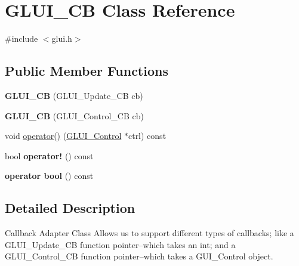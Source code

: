 \hypertarget{class_g_l_u_i___c_b}{\section{G\+L\+U\+I\+\_\+\+C\+B Class Reference}
\label{class_g_l_u_i___c_b}
}


{\ttfamily \#include $<$glui.\+h$>$}

\subsection*{Public Member Functions}
\begin{DoxyCompactItemize}
\item 
\hypertarget{class_g_l_u_i___c_b_a8ee9a7b49fe15afb89985e2218ac17de}{{\bfseries G\+L\+U\+I\+\_\+\+C\+B} (G\+L\+U\+I\+\_\+\+Update\+\_\+\+C\+B cb)}\label{class_g_l_u_i___c_b_a8ee9a7b49fe15afb89985e2218ac17de}

\item 
\hypertarget{class_g_l_u_i___c_b_ab2c48ce5142f91878323797b9ea9472c}{{\bfseries G\+L\+U\+I\+\_\+\+C\+B} (G\+L\+U\+I\+\_\+\+Control\+\_\+\+C\+B cb)}\label{class_g_l_u_i___c_b_ab2c48ce5142f91878323797b9ea9472c}

\item 
void \hyperlink{class_g_l_u_i___c_b_a3677d6a872540cd82d4ba1add46a16eb}{operator()} (\hyperlink{class_g_l_u_i___control}{G\+L\+U\+I\+\_\+\+Control} $\ast$ctrl) const 
\item 
\hypertarget{class_g_l_u_i___c_b_acd93cfbb08c758e75ca38b6caff9131d}{bool {\bfseries operator!} () const }\label{class_g_l_u_i___c_b_acd93cfbb08c758e75ca38b6caff9131d}

\item 
\hypertarget{class_g_l_u_i___c_b_a181c6390f944b9db42de829b83eae7ac}{{\bfseries operator bool} () const }\label{class_g_l_u_i___c_b_a181c6390f944b9db42de829b83eae7ac}

\end{DoxyCompactItemize}


\subsection{Detailed Description}
Callback Adapter Class Allows us to support different types of callbacks; like a G\+L\+U\+I\+\_\+\+Update\+\_\+\+C\+B function pointer--which takes an int; and a G\+L\+U\+I\+\_\+\+Control\+\_\+\+C\+B function pointer--which takes a G\+U\+I\+\_\+\+Control object. 

